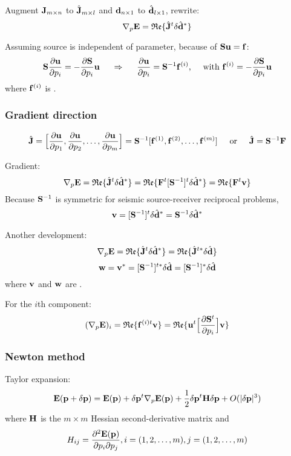 Augment $\mathbf{J}_{m\times n}$ to $\hat{\mathbf{J}}_{m\times l}$
and $\mathbf{d}_{n\times 1}$ to $\hat{\mathbf{d}}_{l\times 1}$,
rewrite:
\[ \nabla_p\mathbf{E}=\mathfrak{Re}\{\hat{\mathbf{J}}^t\delta\hat{\mathbf{d}}^* \} \]

Assuming source is independent of parameter, because of $\mathbf{S}\mathbf{u}=\mathbf{f}$:
\[ \mathbf{S}\frac{\partial\mathbf{u}}{\partial p_i}=-\frac{\partial\mathbf{S}}{\partial p_i}\mathbf{u} \hspace{5mm}\Rightarrow\hspace{5mm} \frac{\partial\mathbf{u}}{\partial p_i}=\mathbf{S}^{-1}\mathbf{f}^{(i)} \text{,\hspace{5mm}with~} \mathbf{f}^{(i)}=-\frac{\partial\mathbf{S}}{\partial p_i}\mathbf{u}\]
where $\mathbf{f}^{(i)}$ is .

\subsubsection{Gradient direction}
\[ \hat{\mathbf{J}}=\Big[\frac{\partial\mathbf{u}}{\partial p_1},\frac{\partial\mathbf{u}}{\partial p_2},\ldots,\frac{\partial\mathbf{u}}{\partial p_m}\Big]=\mathbf{S}^{-1}[\mathbf{f}^{(1)},\mathbf{f}^{(2)},\ldots,\mathbf{f}^{(m)}] \text{\hspace{5mm}or\hspace{5mm}} \hat{\mathbf{J}}=\mathbf{S}^{-1}\mathbf{F} \]

Gradient:
\[ \nabla_p\mathbf{E}=\mathfrak{Re}\{\hat{\mathbf{J}}^t\delta\hat{\mathbf{d}}^*\}=\mathfrak{Re}\{\mathbf{F}^t[\mathbf{S}^{-1}]^t\delta\hat{\mathbf{d}}^*\}=\mathfrak{Re}\{\mathbf{F}^t\mathbf{v}\} \]
Because $\mathbf{S}^{-1}$ is symmetric for seismic source-receiver reciprocal problems,
\[ \mathbf{v}=[\mathbf{S}^{-1}]^t\delta\hat{\mathbf{d}}^*=\mathbf{S}^{-1}\delta\hat{\mathbf{d}}^* \]

Another development:
\[ \nabla_p\mathbf{E}=\mathfrak{Re}\{\hat{\mathbf{J}}^t\delta\hat{\mathbf{d}}^*\}=\mathfrak{Re}\{\hat{\mathbf{J}}^{t*}\delta\hat{\mathbf{d}}\} \]
\[ \mathbf{w}=\mathbf{v}^*=[\mathbf{S}^{-1}]^{t*}\delta\hat{\mathbf{d}}=[\mathbf{S}^{-1}]^*\delta\hat{\mathbf{d}} \]
where $\mathbf{v}$ and $\mathbf{w}$ are .

For the $i$th component:
\[ (\nabla_p\mathbf{E})_i=\mathfrak{Re}\{\mathbf{f}^{(i)t}\mathbf{v}\}=\mathfrak{Re}\{\mathbf{u}^t\Big[\frac{\partial\mathbf{S}^t}{\partial p_i}\Big]\mathbf{v}\} \]

\subsubsection{Newton method}
Taylor expansion:
\[ \mathbf{E}(\mathbf{p}+\delta\mathbf{p})=\mathbf{E}(\mathbf{p})+\delta\mathbf{p}^t\nabla_p\mathbf{E}(\mathbf{p})+\frac{1}{2}\delta\mathbf{p}^t\mathbf{H}\delta\mathbf{p}+O(|\delta\mathbf{p}|^3)  \]
where $\mathbf{H}$ is the $m\times m$ Hessian second-derivative matrix and
\[ H_{ij}=\frac{\partial^2\mathbf{E}(\mathbf{p})}{\partial p_i\partial p_j},i=(1,2,\ldots,m),j=(1,2,\ldots,m) \]


